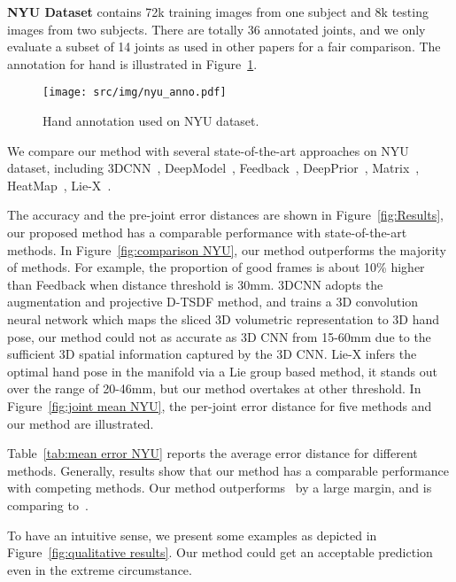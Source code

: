 \documentclass[journal,comsoc]{IEEEtran}
\let\MYoriglatexcaption\caption
\renewcommand{\caption}[2][\relax]{\MYoriglatexcaption[#2]{#2}}
\begin{document}
\textbf{NYU Dataset} contains 72k training images from one subject and 8k testing images from two subjects. There are totally 36
annotated joints, and we only evaluate a subset of 14 joints as used in other papers for a fair comparison. The annotation for hand is illustrated in Figure~\ref{fig:hand NYU}.

\begin{figure}[t]
  \centering
  \texttt{[image: src/img/nyu\_anno.pdf]}\\
  \caption{Hand annotation used on NYU dataset.}\label{fig:hand NYU}
\end{figure}

We compare our method with several state-of-the-art approaches on NYU dataset, including 3DCNN~\cite{Ge_2017_CVPR}, DeepModel~\cite{zhou2016model},
Feedback~\cite{oberweger2015training}, DeepPrior~\cite{oberweger2015hands}, Matrix~\cite{sinha2016deephand}, HeatMap~\cite{
tompson2014real}, Lie-X~\cite{xu2017lie}.

The accuracy and the pre-joint error distances are shown in Figure~\ref{fig:Results},
our proposed method has a comparable performance with state-of-the-art methods.
In Figure~\ref{fig:comparison NYU}, our method outperforms the majority of methods. For example, the proportion of good frames is about 10\%
higher than Feedback when distance threshold is 30mm. 3DCNN adopts the augmentation and projective D-TSDF method, and trains
a 3D convolution neural network which maps the sliced 3D volumetric representation to 3D hand pose, our method could not as accurate as 3D
CNN from 15-60mm due to the sufficient 3D spatial information captured by the 3D CNN.
Lie-X infers the optimal hand pose in the manifold via a Lie group based method, it stands out over the range of 20-46mm, but our method
overtakes at other threshold.
In Figure~\ref{fig:joint mean NYU}, the per-joint error distance for five methods and our method are illustrated.

Table~\ref{tab:mean error NYU} reports the average error distance for different methods. Generally, results show that our method has a
comparable performance with competing methods. Our method outperforms~\cite{tompson2014real,oberweger2015hands,oberweger2015training,zhou2016model}
by a large margin, and is comparing to~\cite{xu2017lie}.

To have an intuitive sense, we present some examples as depicted in Figure~\ref{fig:qualitative results}. Our method could get an acceptable prediction
even in the extreme circumstance.
\end{document}
